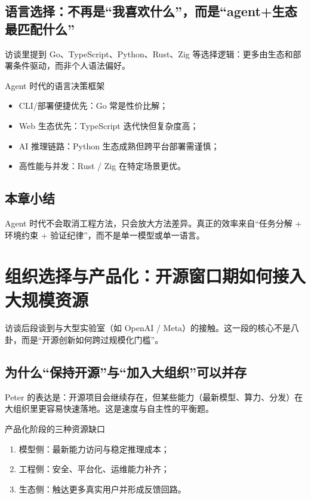 \documentclass[a4paper]{article}
\begin{document}
\subsection{语言选择：不再是“我喜欢什么”，而是“agent+生态最匹配什么”}

访谈里提到 Go、TypeScript、Python、Rust、Zig 等选择逻辑：更多由生态和部署条件驱动，而非个人语法偏好。

\begin{importantbox}{Agent 时代的语言决策框架}
\begin{itemize}
    \item CLI/部署便捷优先：Go 常是性价比解；
    \item Web 生态优先：TypeScript 迭代快但复杂度高；
    \item AI 推理链路：Python 生态成熟但跨平台部署需谨慎；
    \item 高性能与并发：Rust / Zig 在特定场景更优。
\end{itemize}
\end{importantbox}

\subsection{本章小结}
Agent 时代不会取消工程方法，只会放大方法差异。真正的效率来自“任务分解 + 环境约束 + 验证纪律”，而不是单一模型或单一语言。

\section{组织选择与产品化：开源窗口期如何接入大规模资源}

访谈后段谈到与大型实验室（如 OpenAI / Meta）的接触。这一段的核心不是八卦，而是“开源创新如何跨过规模化门槛”。

\subsection{为什么“保持开源”与“加入大组织”可以并存}

Peter 的表达是：开源项目会继续存在，但某些能力（最新模型、算力、分发）在大组织里更容易快速落地。这是速度与自主性的平衡题。

\begin{importantbox}{产品化阶段的三种资源缺口}
\begin{enumerate}
    \item 模型侧：最新能力访问与稳定推理成本；
    \item 工程侧：安全、平台化、运维能力补齐；
    \item 生态侧：触达更多真实用户并形成反馈回路。
\end{enumerate}
\end{importantbox}
\end{document}
